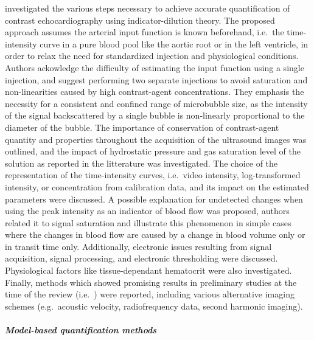 \citet{Wiencek:1993hr} investigated the various steps necessary to achieve accurate quantification of contrast echocardiography using indicator-dilution theory. 
The proposed approach assumes the arterial input function is known beforehand, i.e.~the time-intensity curve in a pure blood pool like the aortic root or in the left ventricle, in order to relax the need for standardized injection and physiological conditions.
Authors ackowledge the difficulty of estimating the input function using a single injection, and suggest performing two separate injections to avoid saturation and non-linearities caused by high contrast-agent concentrations.
They emphasis the necessity for a consistent and confined range of microbubble size, as the intensity of the signal backscattered by a single bubble is non-linearly proportional to the diameter of the bubble.
The importance of conservation of contrast-agent quantity and properties throughout the acquisition of the ultrasound images was outlined, and the impact of hydrostatic pressure and gas saturation level of the solution as reported in the litterature was investigated.
The choice of the representation of the time-intensity curves, i.e.~video intensity, log-transformed intensity, or concentration from calibration data, and its impact on the estimated parameters were discussed.
A possible explanation for undetected changes when using the peak intensity as an indicator of blood flow was proposed, authors related it to signal saturation and illustrate this phenomenon in simple cases where the changes in blood flow are caused by a change in blood volume only or in transit time only.
Additionally, electronic issues resulting from signal acquisition, signal processing, and electronic thresholding were discussed.
Physiological factors like tissue-dependant hematocrit were also investigated.
Finally, methods which showed promising results in preliminary studies at the time of the review (i.e.~\citeyear{Wiencek:1993hr}) were reported, including various alternative imaging schemes (e.g.~acoustic velocity, radiofrequency data, second harmonic imaging).

\paragraph{\em{Model-based quantification methods}\\}

